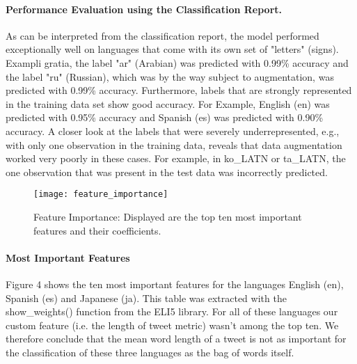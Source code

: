 \documentclass[fleqn,10pt]{SelfArx} %
\begin{document}
\paragraph{Performance Evaluation using the Classification Report.} As can be interpreted from the classification report, the model performed exceptionally well on languages that come with its own set of "letters" (signs). Exampli gratia, the label "ar" (Arabian) was predicted with 0.99\% accuracy and the label "ru" (Russian), which was by the way subject to augmentation, was predicted with 0.99\% accuracy. Furthermore, labels that are strongly represented in the training data set show good accuracy. For Example, English (en) was predicted with 0.95\% accuracy and Spanish (es) was predicted with 0.90\% accuracy. A closer look at the labels that were severely underrepresented, e.g., with only one observation in the training data, reveals that data augmentation worked very poorly in these cases. For example, in ko\_LATN or ta\_LATN, the one observation that was present in the test data was incorrectly predicted.

\begin{figure}[ht]\centering
	\texttt{[image: feature\_importance]}
	\caption{Feature Importance: Displayed are the top ten most important features and their coefficients.}
	\label{fig:results}
\end{figure}

\paragraph{Most Important Features} Figure 4 shows the ten most important features for the languages English (en), Spanish (es) and Japanese (ja). This table was extracted with the \linebreak show\_weights() function from the ELI5 library. For all of these languages our custom feature (i.e. the length of tweet metric) wasn't among the top ten. We therefore conclude that the mean word length of a tweet is not as important for the classification of these three languages as the bag of words itself.
\end{document}
